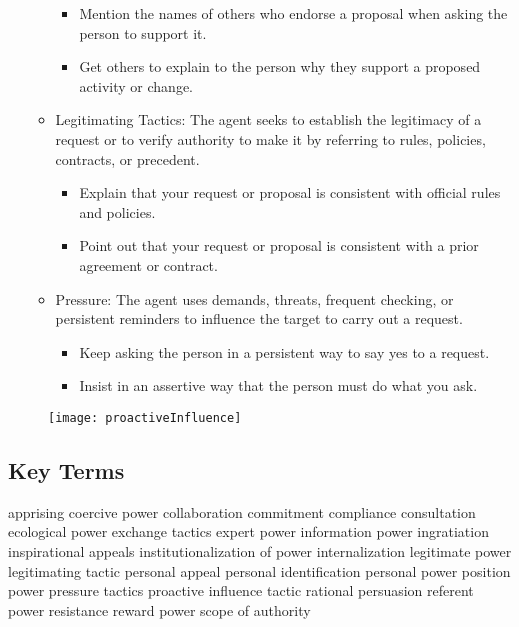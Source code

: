 \begin{itemize}
\begin{itemize}
				\begin{itemize}
					\item Mention the names of others who endorse a proposal when asking the person to support it.
					\item Get others to explain to the person why they support a proposed activity or change.
				\end{itemize}
			\item Legitimating Tactics: The agent seeks to establish the legitimacy of a request or to verify authority to make it by referring to rules, policies, contracts, or precedent.
				\begin{itemize}
					\item Explain that your request or proposal is consistent with official rules and policies.
					\item Point out that your request or proposal is consistent with a prior agreement or contract.
				\end{itemize}
			\item Pressure: The agent uses demands, threats, frequent checking, or persistent reminders to 	influence the target to carry out a request.
				\begin{itemize}
					\item Keep asking the person in a persistent way to say yes to a request.
					\item Insist in an assertive way that the person must do what you ask.
				\end{itemize}
		\end{itemize}
	\end{itemize}

	\begin{figure}[t]
	\texttt{[image: proactiveInfluence]}
	\centering
	\end{figure}

\subsection{Key Terms} %
\label{sub:key_terms}
apprising
coercive power
collaboration
commitment
compliance
consultation
ecological power
exchange tactics
expert power
information power
ingratiation
inspirational appeals
institutionalization of power
internalization
legitimate power
legitimating tactic
personal appeal
personal identification
personal power
position power
pressure tactics
proactive influence tactic
rational persuasion
referent power
resistance
reward power
scope of authority

